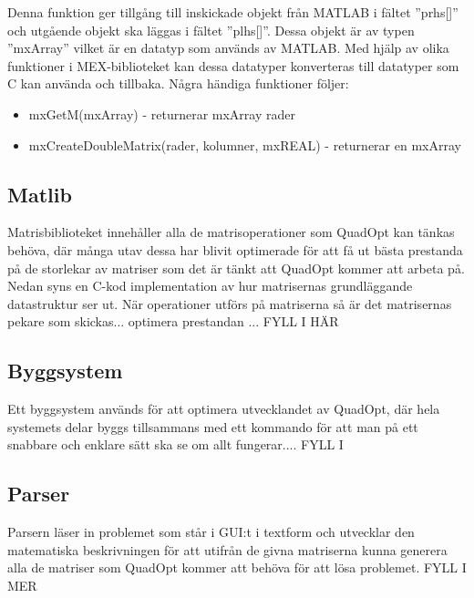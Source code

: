 Denna funktion ger tillgång till inskickade objekt från MATLAB i fältet ''prhs[]'' och utgående objekt ska läggas i fältet ''plhs[]''. Dessa objekt är av typen ''mxArray'' vilket är en datatyp som används av MATLAB. Med hjälp av olika funktioner i MEX-biblioteket kan dessa datatyper konverteras till datatyper som C kan använda och tillbaka. Några händiga funktioner följer:
\begin{itemize}
\item mxGetM(mxArray) - returnerar mxArray rader
\item mxCreateDoubleMatrix(rader, kolumner, mxREAL) - returnerar en mxArray
\end{itemize}



\subsection{Matlib}
Matrisbiblioteket innehåller alla de matrisoperationer som QuadOpt kan tänkas behöva, där många utav dessa har blivit optimerade för att få ut bästa prestanda på de storlekar av matriser som det är tänkt att QuadOpt kommer att arbeta på. Nedan syns en C-kod implementation av hur matrisernas grundläggande datastruktur ser ut. När operationer utförs på matriserna så är det matrisernas pekare som skickas... optimera prestandan ... FYLL I HÄR


\subsection{Byggsystem}
Ett byggsystem används för att optimera utvecklandet av QuadOpt, där hela systemets delar byggs tillsammans med ett kommando för att man på ett snabbare och enklare sätt ska se om allt fungerar....  FYLL I

\subsection{Parser}
Parsern läser in problemet som står i GUI:t i textform och utvecklar den matematiska beskrivningen för att utifrån de givna matriserna kunna generera alla de matriser som QuadOpt kommer att behöva för att lösa problemet. FYLL I MER
